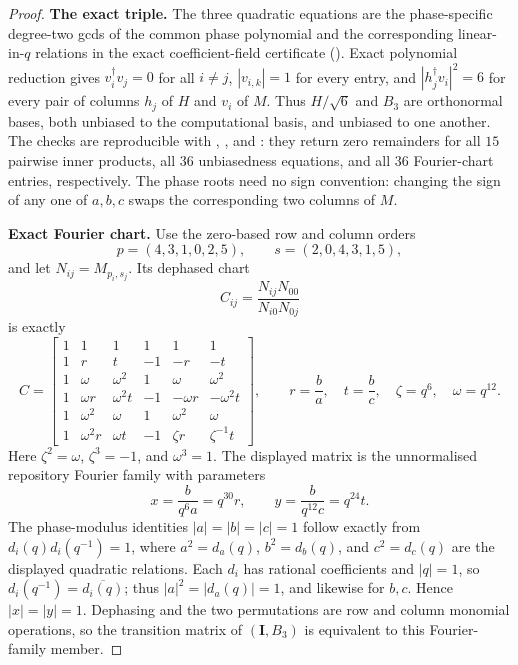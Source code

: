 \begin{proof}
\textbf{The exact triple.} The three quadratic equations are the phase-specific degree-two gcds of the common phase polynomial and the corresponding linear-in-$q$ relations in the exact coefficient-field certificate (). Exact polynomial reduction gives $v_i^\dagger v_j=0$ for all $i\ne j$, $|v_{i,k}|=1$ for every entry, and $|h_j^\dagger v_i|^2=6$ for every pair of columns $h_j$ of $H$ and $v_i$ of $M$. Thus $H/\sqrt6$ and $B_3$ are orthonormal bases, both unbiased to the computational basis, and unbiased to one another. The checks are reproducible with , , and : they return zero remainders for all $15$ pairwise inner products, all $36$ unbiasedness equations, and all $36$ Fourier-chart entries, respectively. The phase roots need no sign convention: changing the sign of any one of $a,b,c$ swaps the corresponding two columns of $M$.

\textbf{Exact Fourier chart.} Use the zero-based row and column orders
\[
p=(4,3,1,0,2,5),\qquad s=(2,0,4,3,1,5),
\]
and let $N_{ij}=M_{p_i,s_j}$. Its dephased chart
\[
C_{ij}=\frac{N_{ij}N_{00}}{N_{i0}N_{0j}}
\]
is exactly
\[
C=\begin{bmatrix}
1&1&1&1&1&1\\
1&r&t&-1&-r&-t\\
1&\omega&\omega^2&1&\omega&\omega^2\\
1&\omega r&\omega^2t&-1&-\omega r&-\omega^2t\\
1&\omega^2&\omega&1&\omega^2&\omega\\
1&\omega^2r&\omega t&-1&\zeta r&\zeta^{-1}t
\end{bmatrix},
\qquad r=\frac ba,\quad t=\frac bc,\quad \zeta=q^6,\quad \omega=q^{12}.
\]
Here $\zeta^2=\omega$, $\zeta^3=-1$, and $\omega^3=1$. The displayed matrix is the unnormalised repository Fourier family with parameters
\[
x=\frac{b}{q^6a}=q^{30}r,\qquad y=\frac{b}{q^{12}c}=q^{24}t.
\]
The phase-modulus identities $|a|=|b|=|c|=1$ follow exactly from $d_i(q)d_i(q^{-1})=1$, where $a^2=d_a(q)$, $b^2=d_b(q)$, and $c^2=d_c(q)$ are the displayed quadratic relations. Each $d_i$ has rational coefficients and $|q|=1$, so $d_i(q^{-1})=\overline{d_i(q)}$; thus $|a|^2=|d_a(q)|=1$, and likewise for $b,c$. Hence $|x|=|y|=1$. Dephasing and the two permutations are row and column monomial operations, so the transition matrix of $(\mathbf{I},B_3)$ is equivalent to this Fourier-family member.


\end{proof}
